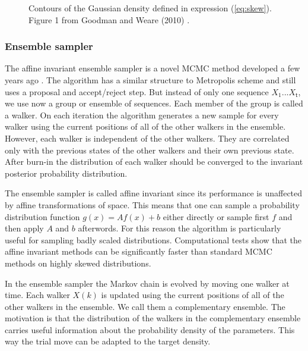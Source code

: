 \documentclass{wihuri}
\def\tstep{\mathsf{t}}
\begin{document}
\begin{figure}
\centerline{}
\caption{Contours of the Gaussian density defined in expression (\ref{eq:skew}). Figure 1 from Goodman and Weare (2010) \cite{ensemble1}.
\label{fig:skewed}}
\end{figure}


\subsubsection{Ensemble sampler}

The affine invariant ensemble sampler is a novel MCMC method developed a few years ago \cite{ensemble1}. %
The algorithm has a similar structure to Metropolis scheme and still uses a proposal and accept/reject step. But instead of only one sequence $X_{1}...X_{\tstep}$, we use now a group or ensemble of sequences. Each member of the group is called a walker. On each iteration the algorithm generates a new sample for every walker using the  current positions of all of the other walkers in
the ensemble. However, each walker is independent of the other walkers. They are correlated only with the previous states of the other walkers and their own previous state. After burn-in the distribution of each walker should be converged to the invariant posterior probability distribution.






The ensemble sampler is called affine invariant since its performance is unaffected by affine transformations of space. This means that one can sample a probability distribution function $g(x) = Af(x) + b$ either directly or sample first $f$ and then apply $A$ and $b$ afterwords. 
For this reason the algorithm is particularly useful for sampling badly scaled distributions. Computational tests show that the affine invariant methods can be significantly faster than standard MCMC methods on highly skewed distributions.

In the ensemble sampler the  Markov chain is evolved by moving one walker at time. Each walker $X(k)$ is updated using the current positions of all of the other walkers in
the ensemble. We call them a complementary ensemble. The motivation is that the distribution of the walkers in the complementary ensemble carries useful information about the probability density of the parameters. This way the trial move can be adapted to the target density.  
\end{document}
